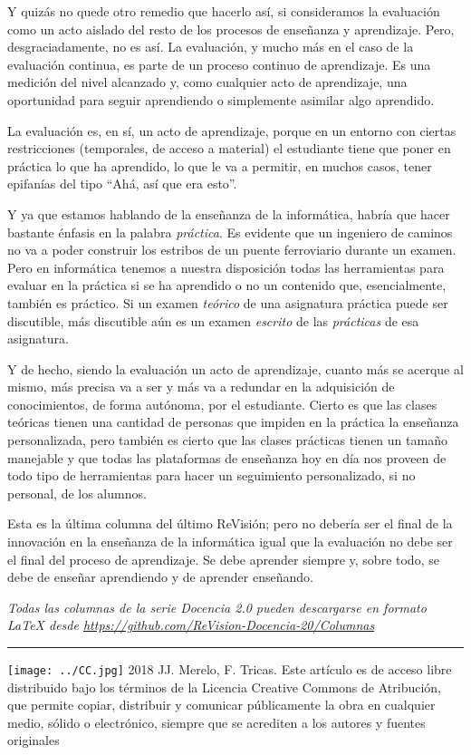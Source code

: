 \documentclass[twoside,10pt]{article}
\newcommand{\surl}[1]{{\small\url{#1}}}
\begin{document}
\begin{multicols}{2}
Y quizás no quede otro remedio que hacerlo así, si consideramos la
evaluación como un acto aislado del resto de los procesos de enseñanza
y aprendizaje. Pero, desgraciadamente, no es así. La evaluación, y
mucho más en el caso de la evaluación continua, es parte de un proceso
continuo de aprendizaje. Es una medición del nivel alcanzado y, como
cualquier acto de aprendizaje, una oportunidad para seguir aprendiendo
o simplemente asimilar algo aprendido. 

\noindent 
\bigskip

La evaluación es, en sí, un acto de aprendizaje, porque en un entorno
con ciertas restricciones (temporales, de acceso a material) el
estudiante tiene que poner en práctica lo que ha aprendido, lo que le
va a permitir, en muchos casos, tener epifanías del tipo ``Ahá, así
que era esto''.

Y ya que estamos hablando de la enseñanza de la informática, habría
que hacer bastante énfasis en la palabra {\em práctica}. Es evidente
que un ingeniero de caminos no va a poder construir los estribos de un
puente ferroviario durante un examen. Pero en informática tenemos a
nuestra disposición todas las herramientas para evaluar en la práctica
si se ha aprendido o no un contenido que, esencialmente, también es
práctico. Si un examen {\em teórico} de una asignatura práctica puede
ser discutible, más discutible aún es un examen {\em escrito} de las
{\em prácticas} de esa asignatura.

Y de hecho, siendo la evaluación un acto de aprendizaje, cuanto más se
acerque al mismo, más precisa va a ser y más va a redundar en la
adquisición de conocimientos, de forma autónoma, por el
estudiante. Cierto es que las clases teóricas tienen una cantidad de
personas que impiden en la práctica la enseñanza personalizada, pero
también es cierto que las clases prácticas tienen un tamaño manejable
y que todas las plataformas de enseñanza hoy en día nos proveen de
todo tipo de herramientas para hacer un seguimiento personalizado, si
no personal, de los alumnos.

Esta es la última columna del último ReVisión; pero no debería ser el
final de la innovación en la enseñanza de la informática igual que la
evaluación no debe ser el final del proceso de aprendizaje. Se debe
aprender siempre y, sobre todo, se debe de enseñar aprendiendo y de
aprender enseñando.

\noindent\emph{Todas las columnas de la serie Docencia 2.0
pueden descargarse en formato LaTeX desde
\surl{https://github.com/ReVision-Docencia-20/Columnas}}

\noindent\rule{90mm}{1pt}

{\small \noindent\texttt{[image: ../CC.jpg]} 2018 JJ. Merelo, F. Tricas. Este artículo es de acceso libre distribuido bajo los términos
de la Licencia Creative Commons de Atribución, que permite copiar,
distribuir y comunicar públicamente la obra en cualquier medio, sólido
o electrónico, siempre que se acrediten a los autores y fuentes
originales}

\end{multicols}
\end{document}
